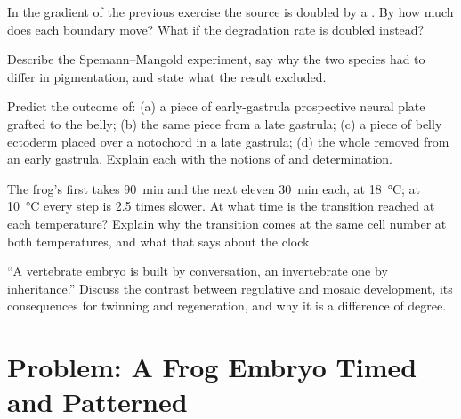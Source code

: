 \begin{exercise}[$\star\star$]\label{exo:b2:vertebrate-development:8}
In the gradient of the previous exercise the source is doubled by a
. By how much does each boundary move? What if the
degradation rate is doubled instead?
\end{exercise}

\begin{exercise}[$\star\star$]\label{exo:b2:vertebrate-development:9}
Describe the Spemann--Mangold experiment, say why the two species
had to differ in pigmentation, and state what the result excluded.
\end{exercise}

\begin{exercise}[$\star\star\star$]\label{exo:b2:vertebrate-development:10}
Predict the outcome of: (a) a piece of early-gastrula prospective
neural plate grafted to the belly; (b) the same piece from a late
gastrula; (c) a piece of belly ectoderm placed over a notochord in a
late gastrula; (d) the whole  removed from an early
gastrula. Explain each with the notions of  and
determination.
\end{exercise}

\begin{exercise}[$\star\star\star$]\label{exo:b2:vertebrate-development:11}
The frog's first  takes \qty{90}{min} and the next eleven
\qty{30}{min} each, at \qty{18}{\celsius}; at \qty{10}{\celsius} every
step is 2.5 times slower. At what time is the 
transition reached at each temperature? Explain why the transition
comes at the same cell number at both temperatures, and what that
says about the clock.
\end{exercise}

\begin{exercise}[$\star\star\star$]\label{exo:b2:vertebrate-development:12}
``A vertebrate embryo is built by conversation, an invertebrate one
by inheritance.'' Discuss the contrast between regulative and mosaic
development, its consequences for twinning and regeneration, and
why it is a difference of degree.
\end{exercise}

\section{Problem: A Frog Embryo Timed and Patterned}

